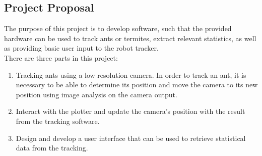 
\subsection{Project Proposal}


The purpose of this project is to develop software, such that the provided hardware can be used to track ants or termites, extract relevant statistics, as well as providing basic user input to the robot tracker. \\

There are three parts in this project:  

\begin{enumerate}
\item Tracking ants using a low resolution camera. In order to track an ant, it is necessary to be able to determine its position and move the camera to its new position using image analysis on the camera output. 

\item Interact with the plotter and update the camera's position with the result from the tracking software. 

\item Design and develop a user interface that can be used to retrieve statistical data from the tracking.  
\end{enumerate}